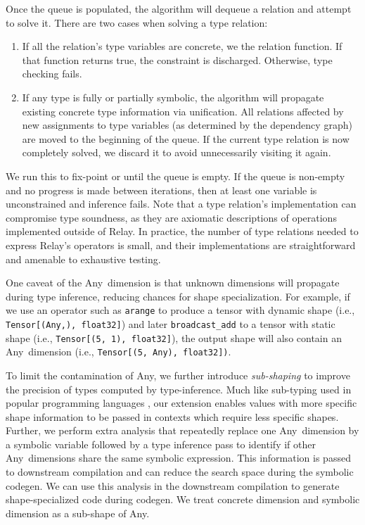 Once the queue is populated, the algorithm will dequeue a relation and attempt to solve it.
There are two cases when solving a type relation:
\begin{enumerate}
  \item If all the relation's type variables
  are concrete, we the relation function. If that function returns true, the
  constraint is discharged. Otherwise, type checking fails.
  \item If any type is fully or partially symbolic, the
    algorithm will propagate
    existing concrete type information via unification.
  All relations affected by new assignments to type
    variables (as determined by the dependency graph)
    are moved to the beginning of the queue.
  If the current type relation is now completely solved, we
  discard it to avoid unnecessarily visiting it again.
\end{enumerate}

We run this to fix-point or until the queue is empty.
If the queue is non-empty and no progress is made between iterations,
  then at least one variable is unconstrained and inference fails.
Note that a type relation's implementation can
  compromise type soundness, as they are axiomatic descriptions
  of operations implemented outside of Relay.
In practice, the number of type relations needed to express Relay's
  operators is small, and their implementations are straightforward
  and amenable to exhaustive testing.

One caveat of the Any~dimension is that unknown dimensions will
  propagate during type inference, reducing chances for shape specialization.
For example, if we use an operator such as {\tt arange} to produce a
  tensor with dynamic shape (i.e., \texttt{Tensor[(Any,), float32]})
  and later {\tt broadcast\_add} to a tensor with static shape (i.e., \texttt{Tensor[(5, 1), float32]}),
  the output shape will also contain an Any~dimension (i.e., \texttt{Tensor[(5, Any), float32])}.

To limit the contamination of Any, we further introduce {\em sub-shaping}
  to improve the precision of types computed by type-inference.
Much like sub-typing used in popular programming languages \citep{LiskovTPLS1994,AmadioAmadioTPLS1993},
  our extension enables values with more specific shape information to be passed in contexts which require less specific shapes.
Further, we perform extra analysis that repeatedly replace one Any~dimension by a symbolic variable followed by
  a type inference pass to identify if other Any~dimensions share the same symbolic expression.
This information is passed to downstream compilation
  and can reduce the search space during the symbolic codegen.
We can use this analysis in the downstream compilation
  to generate shape-specialized code during codegen.
We treat concrete dimension and symbolic dimension as a sub-shape of Any.

